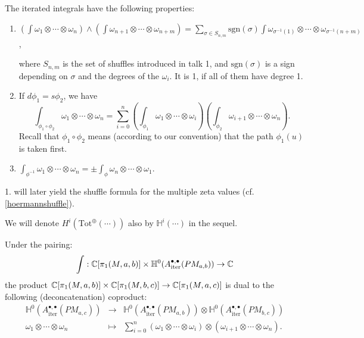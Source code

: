 \begin{prop}\label{hoermannitintprop}
The iterated integrals have the following properties:
\begin{enumerate}
\item $(\int \omega_1 \otimes \cdots \otimes  \omega_n) \wedge (\int \omega_{n+1} \otimes \cdots \otimes \omega_{n+m}) = \sum_{\sigma \in S_{n,m}} \mathrm{sgn}(\sigma) \int \omega_{\sigma^{-1}(1)} \otimes \cdots \otimes \omega_{\sigma^{-1}(n+m)}$,

where $S_{n,m}$ is the set of shuffles introduced in talk 1, and $\mathrm{sgn}(\sigma)$ is a sign depending
on $\sigma$ and the degrees of the $\omega_i$. It is 1, if all of them have degree 1.
\item If $d \phi_1 = s \phi_2$, we have
\[ \int_{\phi_1 \circ \phi_2} \omega_1 \otimes \cdots \otimes \omega_n = \sum_{i=0}^n \left( \int_{\phi_1} \omega_1 \otimes  \cdots \otimes \omega_i \right) \left( \int_{\phi_2} \omega_{i+1} \otimes \cdots \otimes  \omega_n \right). \] Recall that $\phi_1 \circ \phi_2$ means (according to our convention) that the path $\phi_1(u)$ is taken first. 
\item $\int_{\phi^{-1}} \omega_1 \otimes \cdots \otimes \omega_n = \pm \int_\phi  \omega_n \otimes \cdots \otimes \omega_1$.
\end{enumerate}
\end{prop}

\begin{rem}
1. will later yield the shuffle formula for the multiple zeta values (cf. \ref{hoermannshuffle}).
\end{rem}

We will denote $H^i(\mathrm{Tot}^{\oplus}(\cdots))$ also by $\mathbb{H}^i(\cdots)$ in the sequel.

\begin{cor}
Under the pairing:
\[
\int : \mathbb{C}[\pi_1(M, a,b)] \times \mathbb{H}^0(A^{\bullet,\bullet}_{\textrm{iter}}(PM_{a,b})) \to \mathbb{C}
\]
the product $\mathbb{C}[\pi_1(M, a, b)] \times \mathbb{C}[\pi_1(M, b,c)] \rightarrow \mathbb{C}[\pi_1(M,a,c)] $ is dual to the following (deconcatenation) coproduct:
\begin{equation}\label{hoermann_coproduct}
\begin{array}{rcl}
\mathbb{H}^0(A^{\bullet,\bullet}_{\textrm{iter}}(PM_{a,c})) & \to & \mathbb{H}^0(A^{\bullet,\bullet}_{\textrm{iter}}(PM_{a,b})) \otimes \mathbb{H}^0(A^{\bullet,\bullet}_{\textrm{iter}}(PM_{b,c})) \\
\omega_1 \otimes \cdots \otimes \omega_n & \mapsto & \sum_{i=0}^{n} \left(\omega_1 \otimes \cdots \otimes \omega_{i}\right) \otimes \left( \omega_{i+1} \otimes \cdots \otimes \omega_n \right).
\end{array}
\end{equation}
\end{cor}


